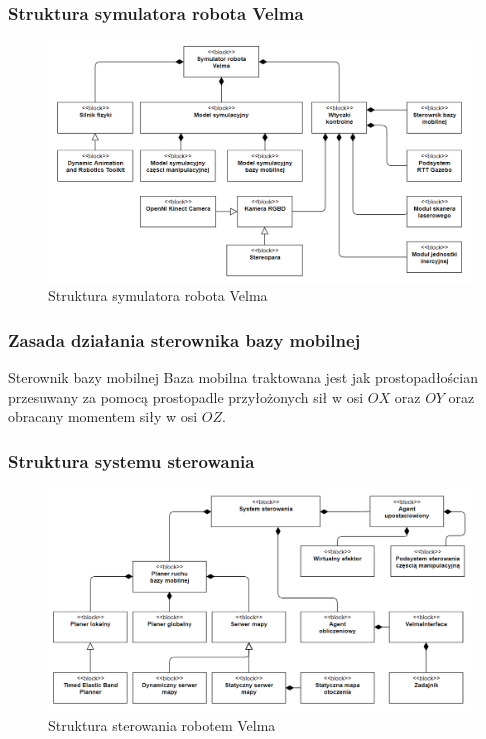 \begin{frame}
    \frametitle{Struktura symulatora robota Velma} 
    \begin{figure}[b]
        \label{sim_system}
        \centering
        \def\svgwidth{\columnwidth}
        \vspace{0.1cm}
        \includegraphics[scale=0.35]{images/sim_system.png}
        \vspace{0.1cm}
        \caption{Struktura symulatora robota Velma}
    \end{figure}
\end{frame}

\begin{frame}
    \frametitle{Zasada działania sterownika bazy mobilnej} 
    \begin{block}{Sterownik bazy mobilnej}
        Baza mobilna traktowana jest jak prostopadłościan przesuwany za pomocą prostopadle przyłożonych
        sił w osi $OX$ oraz $OY$ oraz obracany momentem siły w osi $OZ$.
    \end{block}
\end{frame}

\begin{frame}
    \frametitle{Struktura systemu sterowania} 
    \begin{figure}[b]
        \label{control_system}
        \centering
        \def\svgwidth{\columnwidth}
        \vspace{0.1cm}
        \includegraphics[scale=0.35]{images/control_system.png}
        \vspace{0.1cm}
        \caption{Struktura sterowania robotem Velma}
    \end{figure}
\end{frame}




